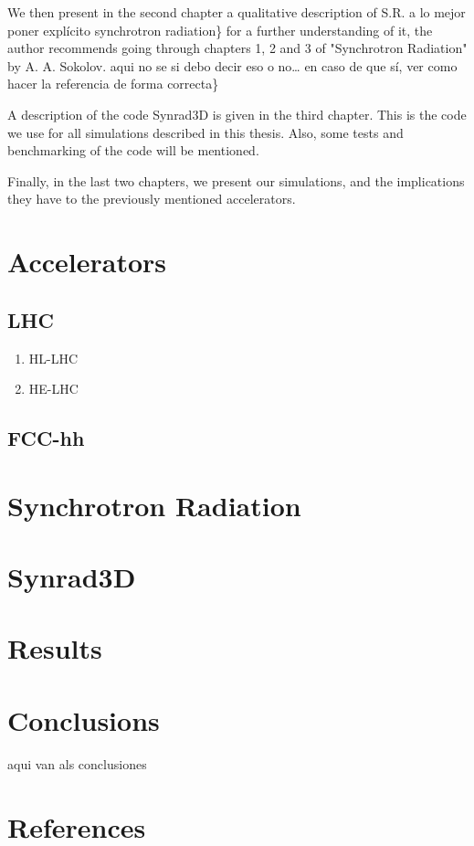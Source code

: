 \documentclass[12pt, letterpaper, twoside, openright]{Thesis} %
\newcommand{\rojo}[1]{{\color{red}{#1}}}
\begin{document}
We then present in the second chapter a qualitative description of S.R. \rojo\{a
lo mejor poner explícito synchrotron radiation\} for a further understanding of
it, the author recommends going through chapters 1, 2 and 3 of "Synchrotron
Radiation" by A. A. Sokolov. \rojo\{aqui no se si debo decir eso o no\ldots{} en caso
de que sí, ver como hacer la referencia de forma correcta\}

A description of the code Synrad3D is given in the third chapter. This is the
code we use for all simulations described in this thesis. Also, some tests and
benchmarking of the code will be mentioned.

Finally, in the last two chapters, we present our simulations, and the
implications they have to the previously mentioned accelerators.
\rojo{prueba de conflictods}

\chapter{Accelerators}
\label{sec:orgb7f1f1f}
\section{LHC}
\label{sec:org049c567}
\begin{enumerate}
\item HL-LHC
\label{sec:org3c7bf75}
\item HE-LHC
\label{sec:orgeed56d8}
\end{enumerate}
\section{FCC-hh}
\label{sec:org23b9199}
\chapter{Synchrotron Radiation}
\label{sec:org5e1a041}
\chapter{Synrad3D}
\label{sec:org121f83e}
\chapter{Results}
\label{sec:org7dd8dd8}
\chapter{Conclusions}
\label{sec:org8164c45}
aqui van als conclusiones
\chapter{References}
\label{sec:orgaf0569c}
\end{document}

